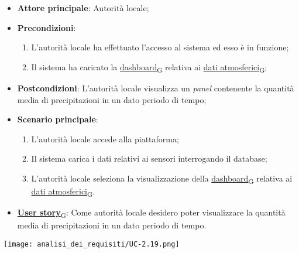 \begin{itemize}
	\item \textbf{Attore principale}: Autorità locale;
	\item \textbf{Precondizioni}:
	      \begin{enumerate}
		      \item L'autorità locale ha effettuato l'accesso al sistema ed esso è in funzione;
		      \item Il sistema ha caricato la \href{https://7last.github.io/docs/rtb/documentazione-interna/glossario\#dashboard}{dashboard\textsubscript{G}} relativa ai \href{https://7last.github.io/docs/rtb/documentazione-interna/glossario\#dati-atmosferici}{dati atmosferici\textsubscript{G}};
	      \end{enumerate}
	\item \textbf{Postcondizioni}: L'autorità locale visualizza un \textit{panel} contenente la quantità media di precipitazioni in
	      un dato periodo di tempo;
	\item \textbf{Scenario principale}:
	      \begin{enumerate}
		      \item L'autorità locale accede alla piattaforma;
		      \item Il sistema carica i dati relativi ai sensori interrogando il database;
		      \item L'autorità locale seleziona la visualizzazione della \href{https://7last.github.io/docs/rtb/documentazione-interna/glossario\#dashboard}{dashboard\textsubscript{G}} relativa ai \href{https://7last.github.io/docs/rtb/documentazione-interna/glossario\#dati-atmosferici}{dati atmosferici\textsubscript{G}}.
	      \end{enumerate}
	\item \href{https://7last.github.io/docs/rtb/documentazione-interna/glossario\#user-story}{\textbf{User story}\textsubscript{G}}: Come autorità locale desidero poter visualizzare la quantità media di precipitazioni in un dato periodo di tempo.
\end{itemize}

\begin{center}
	\texttt{[image: analisi\_dei\_requisiti/UC-2.19.png]}
\end{center}


